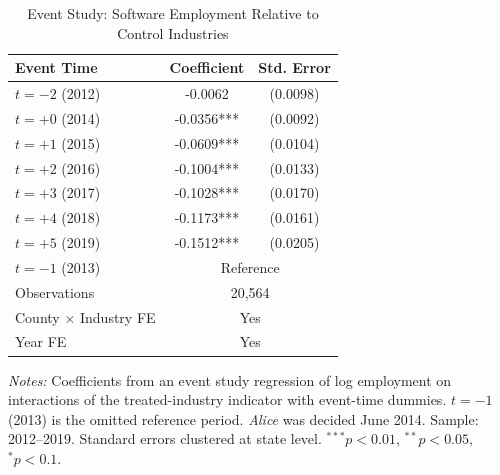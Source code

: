 \begin{table}[t]
\centering
\caption{Event Study: Software Employment Relative to Control Industries}
\label{tab:eventstudy}
\begin{tabular}{lcc}
\toprule
Event Time & Coefficient & Std. Error \\
\midrule
$t = -2$ (2012) & -0.0062 & (0.0098) \\
$t = +0$ (2014) & -0.0356*** & (0.0092) \\
$t = +1$ (2015) & -0.0609*** & (0.0104) \\
$t = +2$ (2016) & -0.1004*** & (0.0133) \\
$t = +3$ (2017) & -0.1028*** & (0.0170) \\
$t = +4$ (2018) & -0.1173*** & (0.0161) \\
$t = +5$ (2019) & -0.1512*** & (0.0205) \\
\midrule
$t = -1$ (2013) & \multicolumn{2}{c}{Reference} \\
\midrule
Observations & \multicolumn{2}{c}{20,564} \\
County $\times$ Industry FE & \multicolumn{2}{c}{Yes} \\
Year FE & \multicolumn{2}{c}{Yes} \\
\bottomrule
\end{tabular}
\begin{tablenotes}
\item \textit{Notes:} Coefficients from an event study regression of log employment
on interactions of the treated-industry indicator with event-time dummies.
$t = -1$ (2013) is the omitted reference period. \textit{Alice} was decided June 2014.
Sample: 2012--2019. Standard errors clustered at state level.
$^{***}p<0.01$, $^{**}p<0.05$, $^{*}p<0.1$.
\end{tablenotes}
\end{table}
